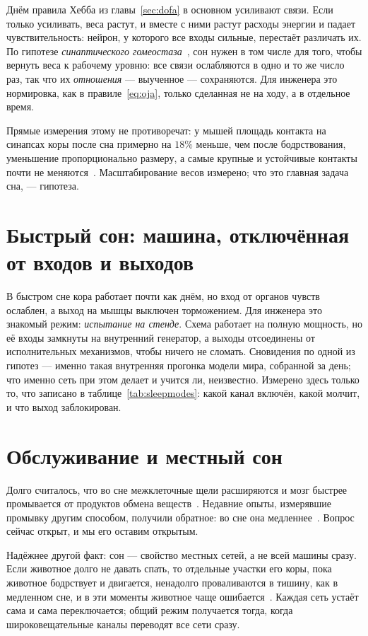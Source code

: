 Днём правила Хебба из главы~\ref{sec:dofa} в основном усиливают связи. Если только усиливать, веса растут, и вместе с ними растут расходы энергии и падает чувствительность: нейрон, у которого все входы сильные, перестаёт различать их. По гипотезе \emph{синаптического гомеостаза}~\cite{TononiCirelli2014}, сон нужен в том числе для того, чтобы вернуть веса к рабочему уровню: все связи ослабляются в одно и то же число раз, так что их \emph{отношения} --- выученное --- сохраняются. Для инженера это нормировка, как в правиле~\eqref{eq:oja}, только сделанная не на ходу, а в отдельное время.

Прямые измерения этому не противоречат: у мышей площадь контакта на синапсах коры после сна примерно на $18\%$ меньше, чем после бодрствования, уменьшение пропорционально размеру, а самые крупные и устойчивые контакты почти не меняются~\cite{deVivo2017}. Масштабирование весов измерено; что это главная задача сна, --- гипотеза.

\section{Быстрый сон: машина, отключённая от входов и выходов}

В быстром сне кора работает почти как днём, но вход от органов чувств ослаблен, а выход на мышцы выключен торможением. Для инженера это знакомый режим: \emph{испытание на стенде}. Схема работает на полную мощность, но её входы замкнуты на внутренний генератор, а выходы отсоединены от исполнительных механизмов, чтобы ничего не сломать. Сновидения по одной из гипотез --- именно такая внутренняя прогонка модели мира, собранной за день; что именно сеть при этом делает и учится ли, неизвестно. Измерено здесь только то, что записано в таблице~\ref{tab:sleepmodes}: какой канал включён, какой молчит, и что выход заблокирован.

\section{Обслуживание и местный сон}

Долго считалось, что во сне межклеточные щели расширяются и мозг быстрее промывается от продуктов обмена веществ~\cite{Xie2013}. Недавние опыты, измерявшие промывку другим способом, получили обратное: во сне она медленнее~\cite{Miao2024}. Вопрос сейчас открыт, и мы его оставим открытым.

Надёжнее другой факт: сон --- свойство местных сетей, а не всей машины сразу. Если животное долго не давать спать, то отдельные участки его коры, пока животное бодрствует и двигается, ненадолго проваливаются в тишину, как в медленном сне, и в эти моменты животное чаще ошибается~\cite{Vyazovskiy2011}. Каждая сеть устаёт сама и сама переключается; общий режим получается тогда, когда широковещательные каналы переводят все сети сразу.

